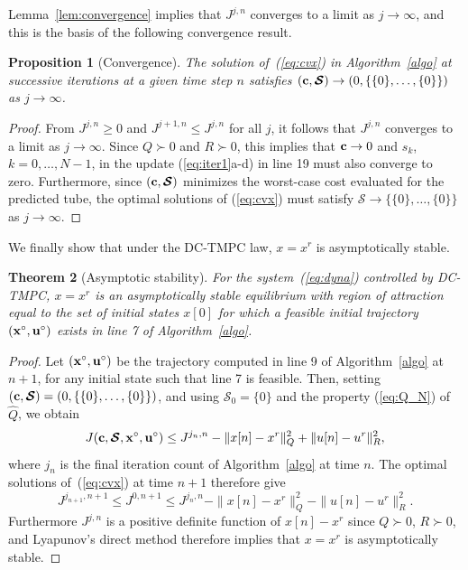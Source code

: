\documentclass[a4paper, 10 pt, conference]{IEEEconf}
\newtheorem{theorem}{Theorem}
\newtheorem{proposition}[theorem]{Proposition}
\def\S{\mathcal{S}}
\def\bc{{\bf c}}
\def\bS{\boldsymbol{\mathcal{S}}}
\begin{document}
Lemma~\ref{lem:convergence} implies that $J^{j,n}$ converges to a limit as $j\to\infty$, and this is the basis of the following convergence result.

\begin{proposition}[Convergence]\label{prop:convergence}
The solution of~(\ref{eq:cvx}) in Algorithm~\ref{algo} at successive iterations at a given time step $n$ satisfies $(\bc,\bS) \to (0,\{\{0\},\ldots,\{0\}\})$ as ${j\to\infty}$.
\end{proposition}

\begin{proof}
From 
$J^{j,n} \geq 0$ and $J^{j+1,n} \leq J^{j,n}$ for all $j$, it follows that $J^{j,n}$ converges to a limit as $j\to\infty$. Since $Q\succ 0$ and $R\succ 0$, this implies that $\bc \to 0$ and $s_k$, $k=0,\ldots,N-1$, in the update (\ref{eq:iter1}a-d) in line 19 must also converge to zero.
Furthermore, since $(\bc,\bS)$ minimizes the worst-case cost evaluated for the predicted tube, the optimal solutions of (\ref{eq:cvx}) must satisfy $\bS \to \{\{0\},\ldots,\{0\}\}$ as $j\to\infty$.
%
\end{proof}



We finally show that under the DC-TMPC law, $x=x^r$ is asymptotically stable. 

\begin{theorem}[Asymptotic stability] 
For the system~(\ref{eq:dyna}) controlled by DC-TMPC, $x=x^r$ is an asymptotically stable equilibrium with region of attraction equal to the set of initial states $x[0]$ for which a feasible initial trajectory $({\bf x}^\circ,{\bf u}^\circ)$ exists in line 7 of Algorithm~\ref{algo}.
\end{theorem}

\begin{proof}
Let $({\bf x}^\circ,{\bf u}^\circ)$ be the trajectory computed in line 9  of Algorithm~\ref{algo} at $n+1$, for any initial state such that line 7 is feasible. Then, setting $(\bc,\bS) = (0,\{\{0\},\ldots,\{0\}\})$, and using $\S_0=\{0\}$ and the property (\ref{eq:Q_N}) of $\hat{Q}$, we obtain 
\[
J(\bc,\bS,{\bf x}^\circ,{\bf u}^\circ) \leq J^{j_{n},n} - \|x[n] - x^r\|_Q^2 + \|u[n] - u^r\|_R^2,
\]
where $j_{n}$ is the final iteration count of Algorithm~\ref{algo} at time $n$. The optimal solutions of~(\ref{eq:cvx}) at time $n+1$ therefore give
\[
J^{j_{n+1},n+1}\leq J^{0,n+1}\leq J^{j_n,n} - \|x[n] - x^r\|_Q^2 - \|u[n] - u^r\|_R^2.
\]
Furthermore $J^{j,n}$ is a positive definite function of $x[n] - x^r$ since $Q\succ 0$, $R\succ 0$, and Lyapunov's direct method therefore implies that $x=x^r$ is asymptotically stable.
\end{proof}
\end{document}
